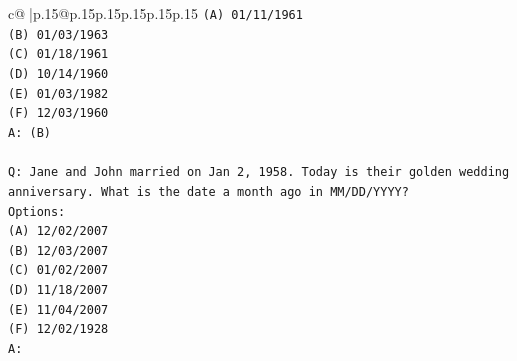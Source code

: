 \documentclass{article}
\begin{document}
{\begin{supertabular}{c@{$\;$}|p{.15\linewidth}@{}p{.15\linewidth}p{.15\linewidth}p{.15\linewidth}p{.15\linewidth}p{.15\linewidth}}
{{{\texttt{(A) 01/11/1961} \\
\texttt{(B) 01/03/1963} \\
\texttt{(C) 01/18/1961} \\
\texttt{(D) 10/14/1960} \\
\texttt{(E) 01/03/1982} \\
\texttt{(F) 12/03/1960} \\
\texttt{A: (B)} \\
\\ 
\texttt{Q: Jane and John married on Jan 2, 1958. Today is their golden wedding anniversary. What is the date a month ago in MM/DD/YYYY?} \\
\texttt{Options:} \\
\texttt{(A) 12/02/2007} \\
\texttt{(B) 12/03/2007} \\
\texttt{(C) 01/02/2007} \\
\texttt{(D) 11/18/2007} \\
\texttt{(E) 11/04/2007} \\
\texttt{(F) 12/02/1928} \\
\texttt{A:} \\
            }
        }
    }
     \\ \\


\end{supertabular}}
\end{document}
